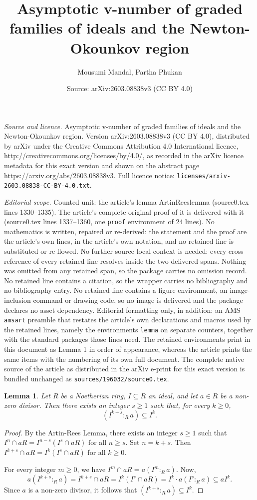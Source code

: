 \documentclass[10pt,a4paper]{amsart}
\title{Asymptotic v-number of graded families of ideals and the Newton-Okounkov region}
\author{Mousumi Mandal, Partha Phukan}
\date{Source: arXiv:2603.08838v3 (CC BY 4.0)}
\newtheorem{lemma}{Lemma}
\begin{document}
\maketitle

\noindent\emph{Source and licence.} Asymptotic v-number of graded families of ideals and the Newton-Okounkov region. Version arXiv:2603.08838v3 (CC BY 4.0), distributed by arXiv under the Creative Commons Attribution 4.0 International licence, http://creativecommons.org/licenses/by/4.0/, as recorded in the arXiv licence metadata for this exact version and shown on the abstract page https://arxiv.org/abs/2603.08838v3. Full licence notice: \texttt{licenses/arxiv-2603.08838-CC-BY-4.0.txt}.\par\smallskip

\noindent\textit{Editorial scope.} Counted unit: the article's lemma ArtinReeslemma (source0.tex lines 1330--1335). The article's complete original proof of it is delivered with it (source0.tex lines 1337--1360, one \texttt{proof} environment of 24 lines). No mathematics is written, repaired or re-derived: the statement and the proof are the article's own lines, in the article's own notation, and no retained line is substituted or re-flowed.  No further source-local context is needed: every cross-reference of every retained line resolves inside the two delivered spans.  Nothing was omitted from any retained span, so the package carries no omission record.  No retained line contains a citation, so the wrapper carries no bibliography and no bibliography entry.  No retained line contains a figure environment, an image-inclusion command or drawing code, so no image is delivered and the package declares no asset dependency.  Editorial formatting only, in addition: an AMS \texttt{amsart} preamble that restates the article's own declarations and macros used by the retained lines, namely the environments \texttt{lemma} on separate counters, together with the standard packages those lines need.  The retained environments print in this document as Lemma 1 in order of appearance, whereas the article prints the same items with the numbering of its own full document.  The complete native source of the article as distributed in the arXiv e-print for this exact version is bundled unchanged as \texttt{sources/196032/source0.tex}.
\begin{lemma}\label{ArtinReeslemma}
Let $R$ be a Noetherian ring, $I\subseteq R$ an ideal, and let $a\in R$ be a non-zero divisor. Then there exists an integer $s\ge 1$ such that, for every $k\ge 0$,
\[
(I^{k+s}:_R a)\subseteq I^k.
\]
\end{lemma}

\begin{proof}
By the Artin-Rees Lemma, there exists an integer $s\ge 1$ such that
\(
I^n\cap aR = I^{n-s}(I^s\cap aR)
\)
for all $n\ge s$. Set $n=k+s$. Then
\(
I^{k+s}\cap aR = I^k(I^s\cap aR)
\)
for all $k\ge 0$.

\noindent For every integer $m\ge 0$, we have
\(
I^m\cap aR = a(I^m:_R a).
\)
Now,
\[
a(I^{k+s}:_R a) = I^{k+s}\cap aR = I^k(I^s\cap aR) = I^k\cdot a(I^s:_R a) \subseteq aI^k.
\]
Since $a$ is a non-zero divisor, it follows that
\(
(I^{k+s}:_R a)\subseteq I^k.
\)
\end{proof}
\end{document}
